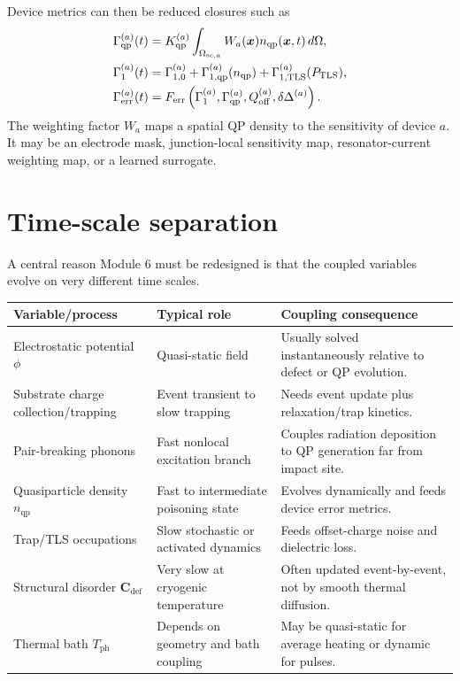\documentclass[11pt]{article}
\newcommand{\x}{\bm{x}}
\newcommand{\phiE}{\phi}
\newcommand{\Qoff}{Q_{\mathrm{off}}}
\newcommand{\Cvec}{\bm{C}_{\mathrm{def}}}
\newcommand{\TLS}{\mathrm{TLS}}
\newcommand{\Tph}{T_{\mathrm{ph}}}
\newcommand{\DeltaSC}{\Delta}
\newcommand{\nqp}{n_{\mathrm{qp}}}
\newcommand{\Gammaqp}{\Gamma_{\mathrm{qp}}}
\newcommand{\Gammaone}{\Gamma_1}
\newcommand{\Gammaerr}{\Gamma_{\mathrm{err}}}
\begin{document}
Device metrics can then be reduced closures such as
\begin{align}
\Gammaqp^{(a)}(t) &= K_{\qp}^{(a)}\int_{\Omega_{\mathrm{sc},a}} W_a(\x)\nqp(\x,t)\,d\Omega,\\
\Gammaone^{(a)}(t) &= \Gamma_{1,0}^{(a)}+\Gamma_{1,\qp}^{(a)}(\nqp)+\Gamma_{1,\TLS}^{(a)}(P_{\TLS}),\\
\Gammaerr^{(a)}(t) &= F_{\mathrm{err}}\left(\Gammaone^{(a)},\Gammaqp^{(a)},\Qoff^{(a)},\delta\DeltaSC^{(a)}\right).
\end{align}
The weighting factor \(W_a\) maps a spatial QP density to the sensitivity of device \(a\). It may be an electrode mask, junction-local sensitivity map, resonator-current weighting map, or a learned surrogate.

\section{Time-scale separation}

A central reason Module 6 must be redesigned is that the coupled variables evolve on very different time scales.

\begin{center}
\begin{tabularx}{\textwidth}{p{}p{}X}
\toprule
\textbf{Variable/process} & \textbf{Typical role} & \textbf{Coupling consequence}\\
\midrule
Electrostatic potential \(\phiE\) & Quasi-static field & Usually solved instantaneously relative to defect or QP evolution.\\
Substrate charge collection/trapping & Event transient to slow trapping & Needs event update plus relaxation/trap kinetics.\\
Pair-breaking phonons & Fast nonlocal excitation branch & Couples radiation deposition to QP generation far from impact site.\\
Quasiparticle density \(\nqp\) & Fast to intermediate poisoning state & Evolves dynamically and feeds device error metrics.\\
Trap/TLS occupations & Slow stochastic or activated dynamics & Feeds offset-charge noise and dielectric loss.\\
Structural disorder \(\Cvec\) & Very slow at cryogenic temperature & Often updated event-by-event, not by smooth thermal diffusion.\\
Thermal bath \(\Tph\) & Depends on geometry and bath coupling & May be quasi-static for average heating or dynamic for pulses.\\
\bottomrule
\end{tabularx}
\end{center}
\end{document}
